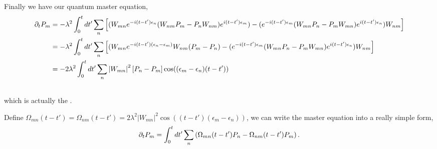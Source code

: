 \documentclass[letterpaper,10pt,english]{sphinxmanual}
\begin{document}
Finally we have our quantum master equation,
\begin{gather}
\begin{split}\partial_t P_m &= -\lambda^2 \int_0^t dt' \sum_n \left[ ( W_{mn} e^{-i(t-t')\epsilon_n} ( W_{nm}P_{m} - P_{n}W_{n m} ) e^{i(t-t')\epsilon_m}) - (e^{-i(t-t')\epsilon_m} ( W_{mn}P_{n} - P_{m}W_{m n} ) e^{i(t-t')\epsilon_n} )W_{nm}  \right] \\
& =  -\lambda^2 \int_0^t dt' \sum_n \left[ ( W_{mn} e^{-i(t-t')(\epsilon_n - \epsilon_m )  }  W_{nm} (P_{m} - P_{n}) - (e^{-i(t-t')\epsilon_m} ( W_{mn}P_{n} - P_{m}W_{m n} ) e^{i(t-t')\epsilon_n} )W_{nm}  \right] \\
& = -2 \lambda^2 \int_0^t dt' \sum_n \left\vert W_{mn} \right\vert^2 \left[ P_n- P_m \right] \cos((\epsilon_m-\epsilon_n)(t-t'))\end{split}\notag\\\begin{split}\end{split}\notag
\end{gather}
which is actually the .

Define $\Omega_{mn}(t-t')=\Omega_{nm}(t-t') = 2\lambda^2 \left\vert W_{mn} \right\vert^2\cos((t-t')(\epsilon_m-\epsilon_n))$, we can write the master equation into a really simple form,
\begin{gather}
\begin{split}\partial_t P_m = \int_0^t dt' \sum_n \left( \Omega_{mn}(t-t') P_n - \Omega_{nm}(t-t') P_m \right).\end{split}\notag\\\begin{split}\end{split}\notag
\end{gather}
\end{document}
